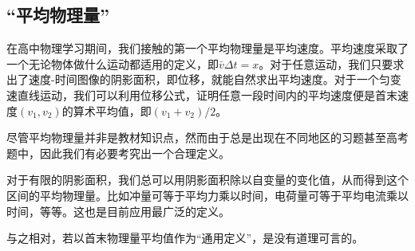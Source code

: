 \subsection{“平均物理量”}
在高中物理学习期间，我们接触的第一个平均物理量是平均速度。平均速度采取了一个无论物体做什么运动都适用的定义，即$\bar v\Delta t=x$。对于任意运动，我们只要求出了速度-时间图像的阴影面积，即位移，就能自然求出平均速度。对于一个匀变速直线运动，我们可以利用位移公式，证明任意一段时间内的平均速度便是首末速度$(v_1,v_2)$的算术平均值，即$(v_1+v_2)/2$。

尽管平均物理量并非是教材知识点，然而由于总是出现在不同地区的习题甚至高考题中，因此我们有必要考究出一个合理定义。

对于有限的阴影面积，我们总可以用阴影面积除以自变量的变化值，从而得到这个区间的平均物理量。比如冲量可等于平均力乘以时间，电荷量可等于平均电流乘以时间，等等。这也是目前应用最广泛的定义。

与之相对，若以首末物理量平均值作为“通用定义”，是没有道理可言的。